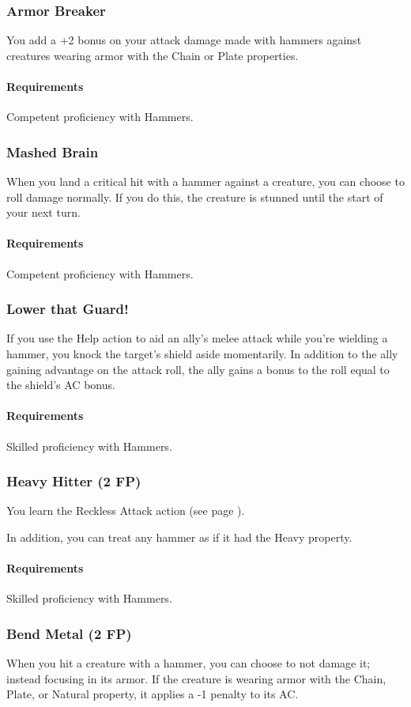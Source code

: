 \subsubsection{Armor Breaker} \label{feat::armorbreaker}
    You add a +2 bonus on your attack damage made with hammers against creatures wearing armor with the Chain or Plate properties.
    \paragraph{Requirements} Competent proficiency with Hammers.
\subsubsection{Mashed Brain} \label{feat::mashedbrain}
    When you land a critical hit with a hammer against a creature, you can choose to roll damage normally.
    If you do this, the creature is stunned until the start of your next turn.
    \paragraph{Requirements} Competent proficiency with Hammers.
\subsubsection{Lower that Guard!} \label{feat::lowerthatguard}
    If you use the Help action to aid an ally's melee attack while you're wielding a hammer, you knock the target's shield aside momentarily.
    In addition to the ally gaining advantage on the attack roll, the ally gains a bonus to the roll equal to the shield's AC bonus.
    \paragraph{Requirements} Skilled proficiency with Hammers.
\subsubsection{Heavy Hitter (2 FP)} \label{feat::heavyhitter}
    You learn the Reckless Attack action (see page \pageref{act::recklessattack}).

    In addition, you can treat any hammer as if it had the Heavy property.
    \paragraph{Requirements} Skilled proficiency with Hammers.
\subsubsection{Bend Metal (2 FP)} \label{feat::bendmetal}
    When you hit a creature with a hammer, you can choose to not damage it; instead focusing in its armor.
    If the creature is wearing armor with the Chain, Plate, or Natural property, it applies a -1 penalty to its AC.

